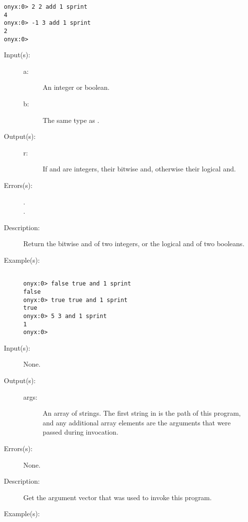 \begin{description}
\begin{description}
\begin{verbatim}
onyx:0> 2 2 add 1 sprint
4
onyx:0> -1 3 add 1 sprint
2
onyx:0>
		\end{verbatim}
	\end{description}
\label{systemdict:and}
\item[{\onyxop{a b}{and}{r}}: ]
	\begin{description}\item[]
	\item[Input(s): ]
		\begin{description}\item[]
		\item[a: ]
			An integer or boolean.
		\item[b: ]
			The same type as .
		\end{description}
	\item[Output(s): ]
		\begin{description}\item[]
		\item[r: ]
			If  and  are integers, their bitwise
			and, otherwise their logical and.
		\end{description}
	\item[Errors(s): ]
		\begin{description}\item[]
		\item[.]
		\item[.]
		\end{description}
	\item[Description: ]
		Return the bitwise and of two integers, or the logical and of
		two booleans.
	\item[Example(s): ]\begin{verbatim}

onyx:0> false true and 1 sprint
false
onyx:0> true true and 1 sprint
true
onyx:0> 5 3 and 1 sprint
1
onyx:0>
		\end{verbatim}
	\end{description}
\label{systemdict:argv}
\item[{\onyxop{--}{argv}{args}}: ]
	\begin{description}\item[]
	\item[Input(s): ] None.
	\item[Output(s): ]
		\begin{description}\item[]
		\item[args: ]
			An array of strings.  The first string in 
			is the path of this program, and any additional
			array elements are the arguments that were passed during
			invocation.
		\end{description}
	\item[Errors(s): ] None.
	\item[Description: ]
		Get the argument vector that was used to invoke this program.
	\item[Example(s): ]\begin{verbatim}


\end{verbatim}
\end{description}
\end{description}
